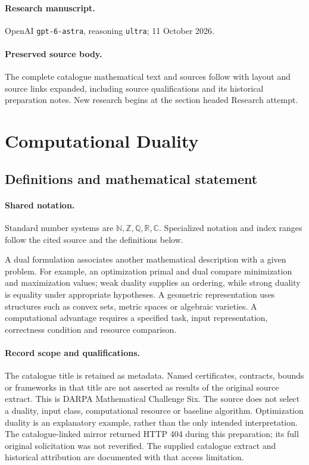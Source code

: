 \documentclass[11pt]{article}
\begin{document}
\paragraph{Research manuscript.} OpenAI \texttt{gpt-6-astra}, reasoning \texttt{ultra}; 11 October 2026.
\paragraph{Preserved source body.} The complete catalogue mathematical text and sources follow with layout and source links expanded, including source qualifications and its historical preparation notes. New research begins at the section headed Research attempt.

\section{Computational Duality}\label{statement}

\subsection{Definitions and mathematical statement}

\paragraph{Shared notation.}Standard number systems are $\mathbb N,\mathbb Z,\mathbb Q,\mathbb R,\mathbb C$. Specialized notation and index ranges follow the cited source and the definitions below.


A dual formulation associates another mathematical description with a given problem. For example, an optimization primal and dual compare minimization and maximization values; weak duality supplies an ordering, while strong duality is equality under appropriate hypotheses. A geometric representation uses structures such as convex sets, metric spaces or algebraic varieties. A computational advantage requires a specified task, input representation, correctness condition and resource comparison.
\paragraph{Record scope and qualifications.}
The catalogue title is retained as metadata. Named certificates, contracts, bounds or frameworks in that title are not asserted as results of the original source extract.
This is DARPA Mathematical Challenge Six. The source does not select a duality, input class, computational resource or baseline algorithm. Optimization duality is an explanatory example, rather than the only intended interpretation. The catalogue-linked mirror returned HTTP 404 during this preparation; its full original solicitation was not reverified. The supplied catalogue extract and historical attribution are documented with that access limitation.
\end{document}
